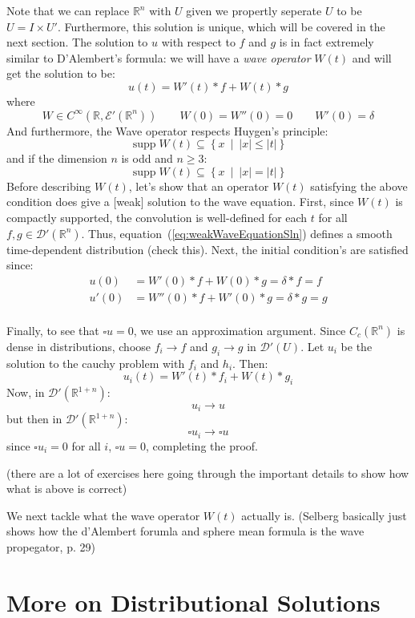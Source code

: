\documentclass{book}
\newcommand{\R}{{\mathbb{R}}}
\newcommand{\CD}{{\mathcal{D}}}
\newcommand{\sse}{\subseteq}
\newcommand{\rw}{\rightarrow}
\newcommand{\supp}{\operatorname{supp}}
\newcommand{\set}[2]{\left\{#1 \ \middle|\ #2\right\}}
\begin{document}
Note that we can replace $\R^n$ with $U$ given we propertly seperate $U$ to be $U = I\times U'$. Furthermore, this
solution is unique, which will be covered in the next section. The solution to $u$ with respect to $f$ and $g$ is in
fact extremely similar to D'Alembert's formula: we will have a \emph{wave operator} $W(t)$ and will get the solution to
be:
\begin{equation}\label{eq:weakWaveEquationSln}
  u(t) = W'(t)* f + W(t) * g
\end{equation}
where
\[
	W \in C^\infty(\R, \mathcal{E}'(\R^n)) \qquad W(0) = W''(0) = 0 \qquad W'(0) = \delta
\]
And furthermore, the Wave operator respects Huygen's principle:
\[
	\supp W(t) \sse \set{x}{|x| \le |t|}
\]
and if the dimension $n$ is odd and $n \ge 3$:
\[
	\supp W(t) \sse \set{x}{|x| = |t|}
\]
Before describing $W(t)$, let's show that an operator $W(t)$ satisfying the above condition does give a [weak] solution
to the wave equation. First, since $W(t)$ is compactly supported, the convolution is well-defined for each $t$ for all
$f,g \in \CD'(\R^n)$. Thus, equation~(\ref{eq:weakWaveEquationSln}) defines a smooth time-dependent distribution (check
this). Next, the initial condition's are satisfied since:
\begin{align*}
	u(0) &= W'(0)*f + W(0) * g = \delta * f = f\\
	u'(0) &= W''(0)*f + W'(0) * g = \delta * g = g\\
\end{align*}

Finally, to see that $\square u = 0$, we use an approximation argument. Since $C_c(\R^n)$ is dense in distributions,
choose $f_i \rw f$ and $g_i \rw g$ in $\CD'(U)$. Let $u_i$ be the solution to the cauchy problem with $f_i$ and $h_i$.
Then:
\[
	u_i(t) = W'(t)*f_i + W(t) *g_i
\]
Now, in $\CD'(\R^{1+n})$:
\[
	u_i \rw u
\]
but then in $\CD'(\R^{1+n})$:
\[
	\square u_i \rw \square u
\]
since $\square u_i = 0$ for all $i$, $\square u = 0$, completing the proof.


(there are a lot of exercises here going through the important details to show how what is above is correct)


We next tackle what the wave operator $W(t)$ actually is. (Selberg basically just shows how the d'Alembert forumla and
sphere mean formula is the wave propegator, p. 29)

\section{More on Distributional Solutions}
\end{document}
